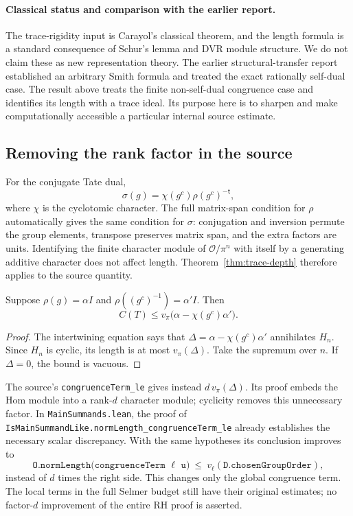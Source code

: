 \paragraph{Classical status and comparison with the earlier report.}
The trace-rigidity input is Carayol's classical theorem, and the length
formula is a standard consequence of Schur's lemma and DVR module
structure.  We do not claim these as new representation theory.
The earlier structural-transfer report established an arbitrary Smith
formula and treated the exact rationally self-dual case.  The result
above treats the finite non-self-dual congruence case and identifies
its length with a trace ideal.  Its purpose here is to sharpen and
make computationally accessible a particular internal source estimate.

\subsection{Removing the rank factor in the source}

For the conjugate Tate dual,
\[
 \sigma(g)=\chi(g^c)\rho(g^c)^{-\mathsf t},
\]
where $\chi$ is the cyclotomic character.  The full matrix-span
condition for $\rho$ automatically gives the same condition for
$\sigma$: conjugation and inversion permute the group elements,
transpose preserves matrix span, and the extra factors are units.
Identifying the finite character module of $\mathcal O/\pi^n$ with
itself by a generating additive character does not affect length.
Theorem~\ref{thm:trace-depth} therefore applies to the source quantity.

\begin{corollary}
\label{cor:sharp-scalar}
Suppose $\rho(g)=\alpha I$ and
$\rho((g^c)^{-1})=\alpha'I$.  Then
\[
 C(T)\leq v_\pi\bigl(\alpha-\chi(g^c)\alpha'\bigr).
\]
\end{corollary}
\begin{proof}
The intertwining equation says that
$\Delta=\alpha-\chi(g^c)\alpha'$ annihilates $H_n$.
Since $H_n$ is cyclic, its length is at most $v_\pi(\Delta)$.
Take the supremum over $n$.  If $\Delta=0$, the bound is vacuous.
\end{proof}

The source's \texttt{congruenceTerm\_le} gives instead
$d\,v_\pi(\Delta)$.  Its proof embeds the Hom module into a rank-$d$
character module; cyclicity removes this unnecessary factor.
In \texttt{MainSummands.lean}, the proof of
\texttt{IsMainSummandLike.normLength\_congruenceTerm\_le}
already establishes the necessary scalar discrepancy.  With the same
hypotheses its conclusion improves to
\[
 \texttt{O.normLength(congruenceTerm }\ell\texttt{ u)}
 \ \leq\ v_\ell(\texttt{D.chosenGroupOrder}),
\]
instead of $d$ times the right side.  This changes only the global
congruence term.  The local terms in the full Selmer budget still have
their original estimates; no factor-$d$ improvement of the entire
RH proof is asserted.\cite{selmerdata,mainsummands}

